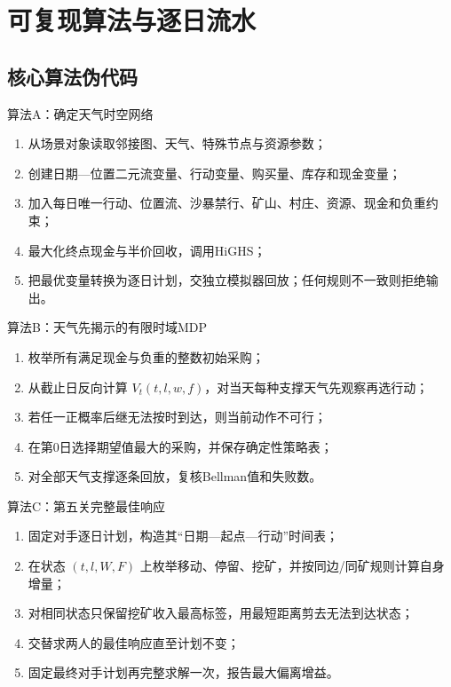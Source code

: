 \section{可复现算法与逐日流水}

\subsection{核心算法伪代码}

\begin{resultbox}{算法A：确定天气时空网络}
\begin{enumerate}[leftmargin=1.8em]
  \item 从场景对象读取邻接图、天气、特殊节点与资源参数；
  \item 创建日期—位置二元流变量、行动变量、购买量、库存和现金变量；
  \item 加入每日唯一行动、位置流、沙暴禁行、矿山、村庄、资源、现金和负重约束；
  \item 最大化终点现金与半价回收，调用HiGHS；
  \item 把最优变量转换为逐日计划，交独立模拟器回放；任何规则不一致则拒绝输出。
\end{enumerate}
\end{resultbox}

\begin{resultbox}{算法B：天气先揭示的有限时域MDP}
\begin{enumerate}[leftmargin=1.8em]
  \item 枚举所有满足现金与负重的整数初始采购；
  \item 从截止日反向计算 $V_t(t,l,w,f)$，对当天每种支撑天气先观察再选行动；
  \item 若任一正概率后继无法按时到达，则当前动作不可行；
  \item 在第0日选择期望值最大的采购，并保存确定性策略表；
  \item 对全部天气支撑逐条回放，复核Bellman值和失败数。
\end{enumerate}
\end{resultbox}

\begin{resultbox}{算法C：第五关完整最佳响应}
\begin{enumerate}[leftmargin=1.8em]
  \item 固定对手逐日计划，构造其“日期—起点—行动”时间表；
  \item 在状态 $(t,l,W,F)$ 上枚举移动、停留、挖矿，并按同边/同矿规则计算自身增量；
  \item 对相同状态只保留挖矿收入最高标签，用最短距离剪去无法到达状态；
  \item 交替求两人的最佳响应直至计划不变；
  \item 固定最终对手计划再完整求解一次，报告最大偏离增益。
\end{enumerate}
\end{resultbox}

